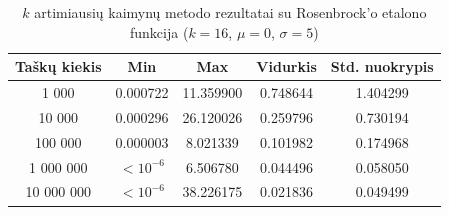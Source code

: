 \begin{table}[H]
    \centering
    \begin{tabular}{|c|c|c|c|c|}
        \hline
        \textbf{Taškų kiekis} & \textbf{Min} & \textbf{Max} & \textbf{Vidurkis} & \textbf{Std. nuokrypis} \\ \hline
        1 000        & 0.000722 & 11.359900 & 0.748644 & 1.404299 \\ \hline
        10 000       & 0.000296 & 26.120026 & 0.259796 & 0.730194 \\ \hline
        100 000      & 0.000003 & 8.021339 & 0.101982 & 0.174968 \\ \hline
        1 000 000    & $<10^{-6}$ & 6.506780 & 0.044496 & 0.058050 \\ \hline
        10 000 000   & $<10^{-6}$ & 38.226175 & 0.021836 & 0.049499 \\ \hline
    \end{tabular}
    \caption{$k$ artimiausių kaimynų metodo rezultatai su Rosenbrock'o etalono funkcija ($k = 16$, $\mu = 0$, $\sigma = 5$)}
\end{table}
